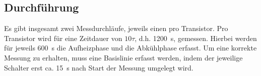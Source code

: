 \subsection{Durchführung}
Es gibt insgesamt zwei Messdurchläufe, jeweils einen pro Transistor. Pro Transistor wird für eine Zeitdauer von $10\tau$, d.h. \SI{1200}{\second}, gemessen. Hierbei werden für jeweils \SI{600}{\second} die Aufheizphase und die Abkühlphase erfasst. Um eine korrekte Messung zu erhalten, muss eine Basislinie erfasst werden, indem der jeweilige Schalter erst ca. \SI{15}{\second} nach Start der Messung umgelegt wird.